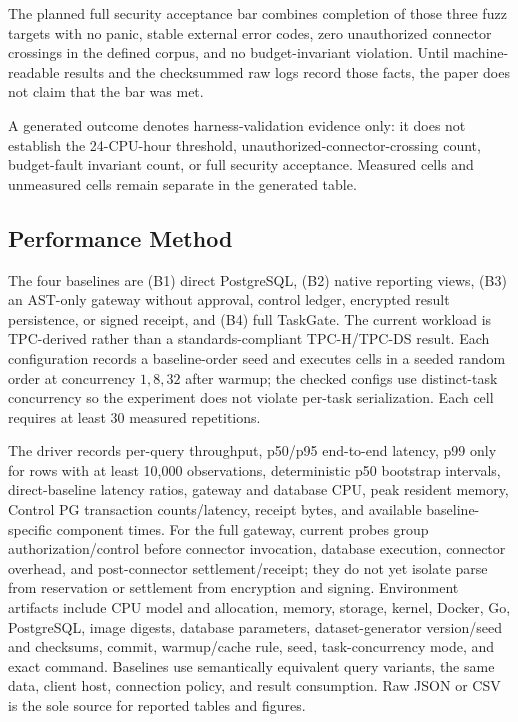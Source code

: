 \documentclass[10pt,journal,compsoc]{IEEEtran}
\newcommand{\system}{TaskGate\xspace}
\newcommand{\code}[1]{\texttt{\detokenize{#1}}}
\begin{document}
The planned full security acceptance bar combines completion of those three
fuzz targets with no panic, stable external error codes, zero unauthorized
connector crossings in the defined corpus, and no budget-invariant violation.
Until machine-readable results and the checksummed raw logs record those facts,
the paper does not claim that the bar was met.

A generated \code{partial} outcome denotes harness-validation evidence only:
it does not establish the 24-CPU-hour threshold, unauthorized-connector-crossing
count, budget-fault invariant count, or full security acceptance.  Measured
cells and unmeasured cells remain separate in the generated table.



\subsection{Performance Method}

The four baselines are (B1) direct PostgreSQL, (B2) native reporting views,
(B3) an AST-only gateway without approval, control ledger, encrypted result
persistence, or signed receipt, and (B4) full \system.  The current workload is
TPC-derived rather than a standards-compliant TPC-H/TPC-DS result.  Each
configuration records a baseline-order seed and executes cells in a seeded
random order at concurrency $1,8,32$ after warmup; the checked configs use
distinct-task concurrency so the experiment does not violate per-task
serialization.  Each cell requires at least 30 measured repetitions.

The driver records per-query throughput, p50/p95 end-to-end latency, p99 only
for rows with at least 10,000 observations, deterministic p50 bootstrap
intervals, direct-baseline latency ratios, gateway and database CPU, peak
resident memory, Control PG transaction counts/latency, receipt bytes, and
available baseline-specific component times.  For the full
gateway, current probes group authorization/control before connector invocation,
database execution, connector overhead, and post-connector settlement/receipt;
they do not yet isolate parse from reservation or settlement from encryption and
signing.  Environment artifacts include CPU model and allocation, memory,
storage, kernel, Docker, Go, PostgreSQL, image digests, database parameters,
dataset-generator version/seed and checksums, commit, warmup/cache rule, seed,
task-concurrency mode, and exact command.  Baselines use semantically
equivalent query variants, the same data, client host, connection policy, and
result consumption.  Raw JSON or CSV is the sole source for reported tables and
figures.
\end{document}
